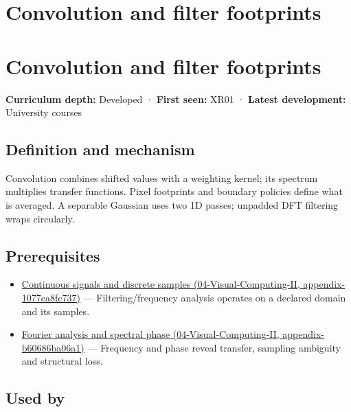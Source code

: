 \hypertarget{appendix-d5b3c692d9f0}{}
\section*{Convolution and filter footprints}
\section{Convolution and filter footprints}\label{appendix-d5b3c692d9f0-convolution-and-filter-footprints}

\textbf{Curriculum depth:} Developed · \textbf{First seen:} XR01 · \textbf{Latest development:} University courses

\subsection{Definition and mechanism}\label{appendix-d5b3c692d9f0-definition-and-mechanism}

Convolution combines shifted values with a weighting kernel; its spectrum multiplies transfer functions. Pixel footprints and boundary policies define what is averaged. A separable Gaussian uses two 1D passes; unpadded DFT filtering wraps circularly.

\subsection{Prerequisites}\label{appendix-d5b3c692d9f0-prerequisites}

\begin{itemize}
\tightlist
\item
  \href{../04-Visual-Computing-II/main.pdf\#nameddest=appendix-1077ea8fc737}{Continuous signals and discrete samples (04-Visual-Computing-II, appendix-1077ea8fc737)} --- Filtering/frequency analysis operates on a declared domain and its samples.
\item
  \href{../04-Visual-Computing-II/main.pdf\#nameddest=appendix-b60686ba06a1}{Fourier analysis and spectral phase (04-Visual-Computing-II, appendix-b60686ba06a1)} --- Frequency and phase reveal transfer, sampling ambiguity and structural loss.
\end{itemize}

\subsection{Used by}\label{appendix-d5b3c692d9f0-used-by}

